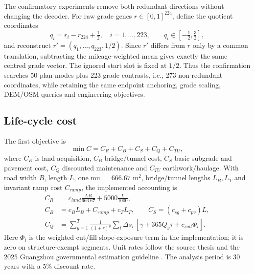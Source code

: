\documentclass[preprint,12pt]{elsarticle}
\begin{document}
The confirmatory experiments remove both redundant directions without changing the decoder. For raw grade genes $r\in[0,1]^{224}$, define the quotient coordinates
\begin{equation}
q_i=r_i-r_{224}+\tfrac12,\quad i=1,\ldots,223,
\qquad q_i\in[-\tfrac12,\tfrac32],
\end{equation}
and reconstruct $r'=(q_1,\ldots,q_{223},1/2)$. Since $r'$ differs from $r$ only by a common translation, subtracting the mileage-weighted mean gives exactly the same centred grade vector. The ignored start slot is fixed at $1/2$. Thus the confirmation searches 50 plan modes plus 223 grade contrasts, i.e., 273 non-redundant coordinates, while retaining the same endpoint anchoring, grade scaling, DEM/OSM queries and engineering objectives.

\subsection{Life-cycle cost}

The first objective is
\begin{equation}
\min C=C_R+C_B+C_S+C_Q+C_{TU},
\label{eq:lcc}
\end{equation}
where $C_R$ is land acquisition, $C_B$ bridge/tunnel cost, $C_S$ basic subgrade and pavement cost, $C_Q$ discounted maintenance and $C_{TU}$ earthwork/haulage. With road width $B$, length $L$, one mu $=666.67$ m$^2$, bridge/tunnel lengths $L_B,L_T$ and invariant ramp cost $C_{ramp}$, the implemented accounting is
\begin{align}
C_R&=c_{land}\frac{LB}{666.67}+5000\frac{L}{1000},\\
C_B&=c_B L_B+C_{ramp}+c_T L_T,\qquad
C_S=(c_{sg}+c_{pv})L,\label{eq:lccparts}\\
C_Q&=\sum_{y=1}^{T}\frac{1}{(1+r)^y}
\sum_i\Delta s_i\,[\gamma+365Q_y\tau+c_{soil}\Phi_i].
\end{align}
Here $\Phi_i$ is the weighted cut/fill slope-exposure term in the implementation; it is zero on structure-exempt segments. Unit rates follow the source thesis and the 2025 Guangzhou governmental estimation guideline \cite{guangzhou2025}. The analysis period is 30 years with a 5\% discount rate.
\end{document}
